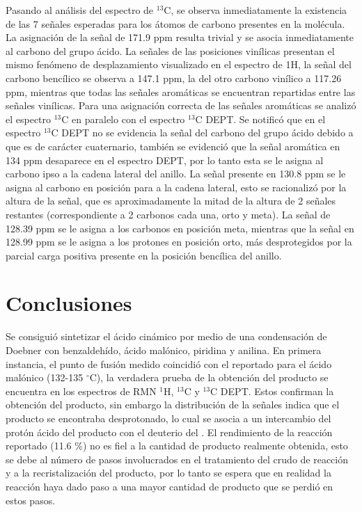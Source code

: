 \documentclass[fleqn,11pt]{SelfArx}
\begin{document}
Pasando al análisis del espectro de $^{13}$C, se observa inmediatamente la existencia de las 7 señales esperadas para los átomos de carbono presentes en la molécula. La asignación de la señal de 171.9 ppm resulta trivial y se asocia inmediatamente al carbono del grupo ácido. La señales de las posiciones vinílicas presentan el mismo fenómeno de desplazamiento visualizado en el espectro de 1H, la señal del carbono bencílico se observa a 147.1 ppm, la del otro carbono vinílico a 117.26 ppm, mientras que todas las señales aromáticas se encuentran repartidas entre las señales vinílicas. Para una asignación correcta de las señales aromáticas se analizó el espectro $^{13}$C en paralelo con el espectro $^{13}$C DEPT. Se notificó que en el espectro $^{13}$C DEPT no se evidencia la señal del carbono del grupo ácido debido a que es de carácter cuaternario, también se evidenció que la señal aromática en 134 ppm desaparece en el espectro DEPT, por lo tanto esta se le asigna al carbono ipso a la cadena lateral del anillo. La señal presente en 130.8 ppm se le asigna al carbono en posición para a la cadena lateral, esto se racionalizó por la altura de la señal, que es aproximadamente la mitad de la altura de 2 señales restantes (correspondiente a 2 carbonos cada una, orto y meta). La señal de 128.39 ppm se le asigna a los carbonos en posición meta, mientras que la señal en 128.99 ppm se le asigna a los protones en posición orto, más desprotegidos por la parcial carga positiva presente en la posición bencílica del anillo.

\section{Conclusiones}
Se consiguió sintetizar el ácido cinámico por medio de una condensación de Doebner con benzaldehído, ácido malónico, piridina y anilina. En primera instancia, el punto de fusión medido coincidió con el reportado para el ácido malónico (132-135 $^\circ$C), la verdadera prueba de la obtención del producto se encuentra en los espectros de RMN $^1$H, $^{13}$C y $^{13}$C DEPT. Estos confirman la obtención del producto, sin embargo la distribución de la señales indica que el producto se encontraba desprotonado, lo cual se asocia a un intercambio del protón ácido del producto con el deuterio del . El rendimiento de la reacción reportado (11.6 \%) no es fiel a la cantidad de producto realmente obtenida, esto se debe al número de pasos involucrados en el tratamiento del crudo de reacción y a la recristalización del producto, por lo tanto se espera que en realidad la reacción haya dado paso a una mayor cantidad de producto que se perdió en estos pasos.
\end{document}
